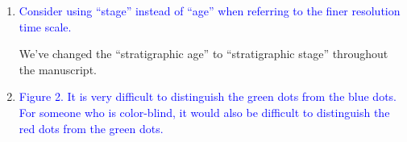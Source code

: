 \documentclass[12pt,letterpaper]{article}
\renewcommand{\section}[1]{%
\bigskip
\begin{center}
\begin{Large}
\normalfont\scshape #1
\medskip
\end{Large}
\end{center}}
\begin{document}
\begin{enumerate}
\item{\textcolor{blue}{Consider using ``stage'' instead of ``age'' when referring to the finer resolution time scale.}}

We've changed the ``stratigraphic age'' to ``stratigraphic stage'' throughout the manuscript.

\item{\textcolor{blue}{Figure 2. It is very difficult to distinguish the green dots from the blue dots. For someone who is color-blind, it would also be difficult to distinguish the red dots from the green dots.}}


\end{enumerate}






%
%














\end{document}
